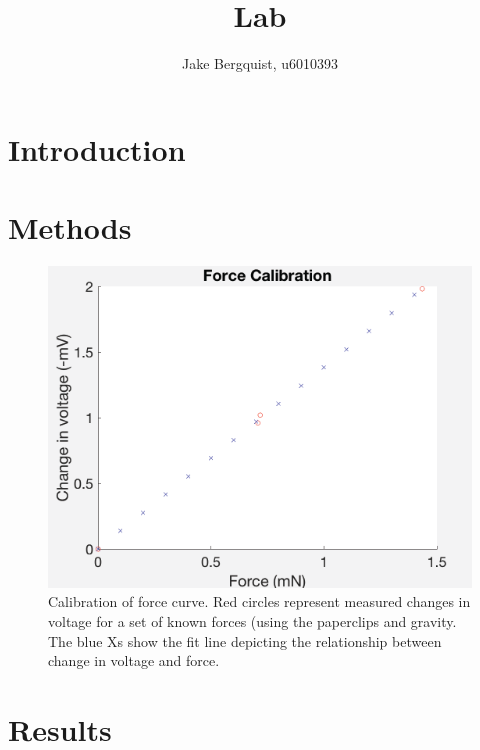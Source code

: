 \documentclass[12pt]{article}
\begin{document}
\title{Lab }
\author{Jake Bergquist, u6010393}
\maketitle
\tableofcontents
\newpage

\section{Introduction}



\section{Methods}


\begin{figure}[H]
	\label{fig:forceCal}
	\centering
	\includegraphics[width = .95\textwidth]{Figures/ForceCal.png}
	\caption{Calibration of force curve. Red circles represent measured changes in voltage for a  set of known forces (using the paperclips and gravity. The blue Xs show the fit line depicting the relationship between change in voltage and force. }
\end{figure}





\section{Results}
\end{document}
